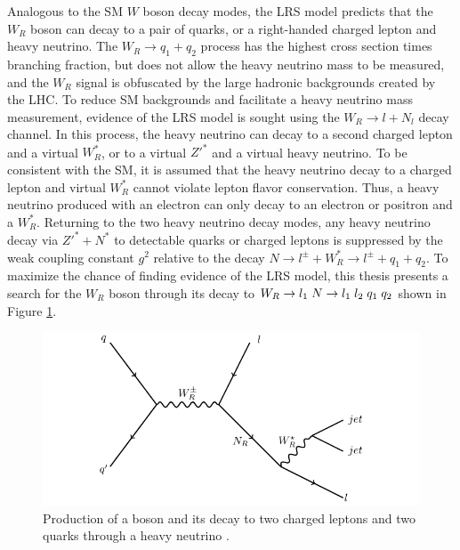 Analogous to the SM $W$ boson decay modes, the LRS model predicts that the $W_{R}$ boson can 
decay to a pair of quarks, or a right-handed charged lepton and heavy neutrino.  The $W_{R} \rightarrow q_{1} + q_{2}$ 
process has the highest cross section times branching fraction, but does not allow the heavy 
neutrino mass to be measured, and the $W_{R}$ signal is obfuscated by the large hadronic 
backgrounds created by the LHC.  To reduce SM backgrounds and facilitate a heavy neutrino mass 
measurement, evidence of the LRS model is sought using the $W_{R} \rightarrow l + N_{l}$ 
decay channel.  In this process, the heavy neutrino can decay to a second charged 
lepton and a virtual $W^{*}_{R}$, or to a virtual $Z'^{*}$ and a virtual heavy neutrino.  To 
be consistent with the SM, it is assumed that the heavy neutrino decay to a charged lepton and 
virtual $W^{*}_{R}$ cannot violate lepton flavor conservation.  Thus, a heavy neutrino produced 
with an electron can only decay to an electron or positron and a $W^{*}_{R}$.  Returning to the 
two heavy neutrino decay modes, any heavy neutrino decay via $Z'^{*} + N^{*}$ to detectable quarks or 
charged leptons is suppressed by the weak coupling constant $g^{2}$ relative to 
the decay $N \rightarrow l^{\pm} + W^{*}_{R} \rightarrow l^{\pm} + q_{1} + q_{2}$.  To maximize 
the chance of finding evidence of the LRS model, this thesis presents a search 
for the $W_{R}$ boson through its decay to $W_{R} \rightarrow l_{1}\thickspace N\rightarrow 
l_{1}\thickspace l_{2}\thickspace q_{1}\thickspace q_{2}$ shown in Figure \ref{fig:wrFeynmanDiagram}.


\begin{figure}[h]
	\centering
	\includegraphics[width=1.0\textwidth]{figures/feynman.pdf}
	\caption{Production of a \WR boson and its decay to two charged leptons and two quarks through 
	a heavy neutrino \nul.}
	\label{fig:wrFeynmanDiagram}
\end{figure}

